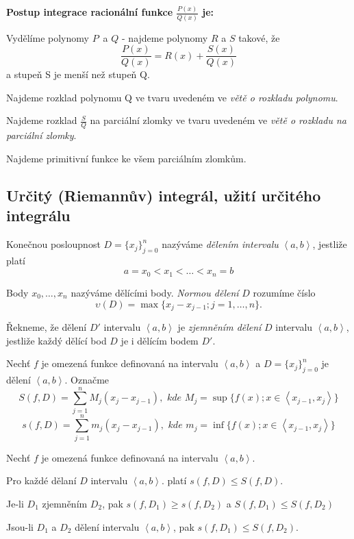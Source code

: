 \textbf{Postup integrace racionální funkce $\frac{P(x)}{Q(x)}$ je:}
\begin{penumerate}
\item Vydělíme polynomy $P$ a $Q$ - najdeme polynomy $R$ a $S$ takové, že
	$$\frac{P(x)}{Q(x)} = R(x) + \frac{S(x)}{Q(x)}$$
	a stupeň S je menší než stupeň Q.

\item Najdeme rozklad polynomu Q ve tvaru uvedeném ve \emph{větě o rozkladu polynomu}.

\item Najdeme rozklad $\frac{S}{Q}$ na parciální zlomky ve tvaru uvedeném ve \emph{větě o rozkladu na parciální zlomky}.

\item Najdeme primitivní funkce ke všem parciálním zlomkům.
\end{penumerate}

\subsection{Určitý (Riemannův) integrál, užití určitého integrálu}

\begin{definice}
Konečnou posloupnost $D=\{x_j\}_{j=0}^n$ nazýváme \emph{dělením intervalu} $\left<a,b\right>$, jestliže platí
$$a=x_0 < x_1 < \dots < x_n = b$$

Body $x_0,\dots,x_n$ nazýváme dělícími body. \emph{Normou dělení} $D$ rozumíme číslo
$$\upsilon(D)=\max\{x_j-x_{j-1}; j=1,\dots,n\}.$$

Řekneme, že dělení $D'$ intervalu $\left<a,b\right>$ je \emph{zjemněním dělení} $D$ intervalu $\left<a,b\right>$, jestliže každý dělící bod $D$ je i dělícím bodem $D'$.
\end{definice}

\begin{definice}
Nechť $f$ je omezená funkce definovaná na intervalu $\left<a,b\right>$ a $D=\{x_j\}_{j=0}^n$ je dělení $\left<a,b\right>$. Označme
$$S(f,D)=\sum_{j=1}^{n} M_j(x_j-x_{j-1}), \textit{ kde } M_j=\sup\{f(x); x\in \left<x_{j-1},x_j\right>\}$$
$$s(f,D)=\sum_{j=1}^{n} m_j(x_j-x_{j-1}), \textit{ kde } m_j=\inf\{f(x); x\in \left<x_{j-1},x_j\right>\}$$

\begin{poznamka}
Nechť $f$ je omezená funkce definovaná na intervalu $\left<a,b\right>$.
\begin{penumerate}
	\item Pro každé dělaní $D$ intervalu $\left<a,b\right>$. platí $s(f,D)\le S(f,D)$.
	\item Je-li $D_1$ zjemněním $D_2$, pak $s(f,D_1) \ge s(f,D_2)$ a $S(f,D_1) \le S(f, D_2)$
	\item Jsou-li $D_1$ a $D_2$ dělení intervalu $\left<a,b\right>$, pak $s(f,D_1) \le S(f, D_2)$.
\end{penumerate}
\end{poznamka}
\end{definice}

